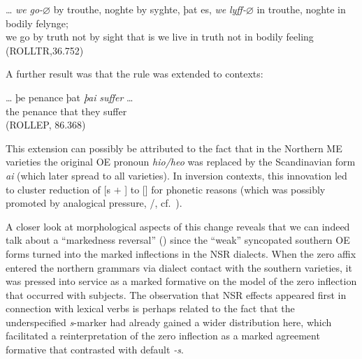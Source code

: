 \documentclass[output=paper]{langsci/langscibook}
\begin{document}
\ea
\gll \ldots{} \textit{we} \textit{go{-$\varnothing$}} by trouthe, noghte by syghte, þat es, \textit{we} \textit{lyff{-$\varnothing$}} in trouthe, noghte in bodily felynge;\\
{} we go by truth not by sight that is we live in truth not in bodily feeling\\
\glt (ROLLTR,36.752)
\z

\noindent
A further result was that the rule was extended to \Tpl{} contexts:

\ea
\gll \ldots{}  þe   penance    þat    \textit{þai} \textit{suffer} \ldots{}\\
{} the  penance  that  they  suffer {}\\
\glt (ROLLEP, 86.368)

\z

This extension can possibly be attributed to the fact that in the Northern ME
varieties the original \gls{OE} \Tpl{} pronoun \emph{hio/heo} was replaced by the
Scandinavian form \emph{\dh{}ai} (which later spread to all varieties). In
inversion contexts, this innovation led to cluster reduction of [s $+$ \dh{}] to
[\dh{}] for phonetic reasons (which was possibly promoted by analogical
pressure, \Fpl{}/\Spl{}, cf.\ \citealt[56]{Pietsch:2005a}).

A closer look at morphological aspects of this change reveals that we can
indeed talk about a ``markedness reversal'' (\citealt{Pietsch:2005a}) since the
``weak'' syncopated southern \gls{OE} forms turned into the marked inflections in
the \gls{NSR} dialects. When the zero affix entered the northern grammars via
dialect contact with the southern varieties, it was pressed into service as a
marked  formative on the model of the zero inflection that occurred
with \Fsg{} subjects.  The observation that \gls{NSR} effects appeared first in
connection with lexical verbs is perhaps related to the fact that the
underspecified \emph{s}-marker had already gained a wider distribution here,
which facilitated a reinterpretation of the zero inflection as a marked
agreement formative that contrasted with default \emph{-s}.
\end{document}

